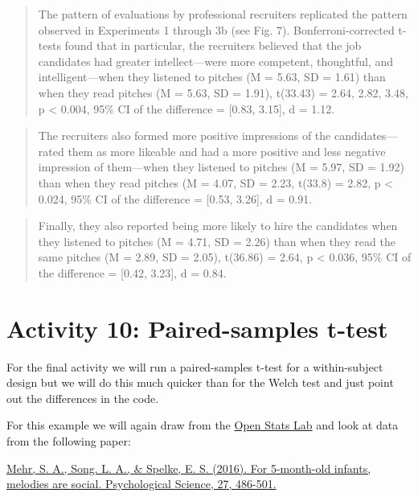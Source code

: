 \documentclass[]{book}
\begin{document}
\begin{quote}
The pattern of evaluations by professional recruiters replicated the pattern observed in Experiments 1 through 3b (see Fig. 7). Bonferroni-corrected t-tests found that in particular, the recruiters believed that the job candidates had greater intellect---were more competent, thoughtful, and intelligent---when they listened to pitches (M = 5.63, SD = 1.61) than when they read pitches (M = 5.63, SD = 1.91), t(33.43) = 2.64, 2.82, 3.48, p \textless{} 0.004, 95\% CI of the difference = {[}0.83, 3.15{]}, d = 1.12.
\end{quote}

\begin{quote}
The recruiters also formed more positive impressions of the candidates---rated them as more likeable and had a more positive and less negative impression of them---when they listened to pitches (M = 5.97, SD = 1.92) than when they read pitches (M = 4.07, SD = 2.23, t(33.8) = 2.82, p \textless{} 0.024, 95\% CI of the difference = {[}0.53, 3.26{]}, d = 0.91.
\end{quote}

\begin{quote}
Finally, they also reported being more likely to hire the candidates when they listened to pitches (M = 4.71, SD = 2.26) than when they read the same pitches (M = 2.89, SD = 2.05), t(36.86) = 2.64, p \textless{} 0.036, 95\% CI of the difference = {[}0.42, 3.23{]}, d = 0.84.
\end{quote}

\hypertarget{activity-10-paired-samples-t-test}{%
\section{Activity 10: Paired-samples t-test}\label{activity-10-paired-samples-t-test}}

For the final activity we will run a paired-samples t-test for a within-subject design but we will do this much quicker than for the Welch test and just point out the differences in the code.

For this example we will again draw from the \href{https://sites.trinity.edu/osl/data-sets-and-activities/t-test-activities}{Open Stats Lab} and look at data from the following paper:

\href{https://journals.sagepub.com/stoken/default+domain/d5HcBHg85XamSXGdYqYN/full}{Mehr, S. A., Song. L. A., \& Spelke, E. S. (2016). For 5-month-old infants, melodies are social. Psychological Science, 27, 486-501.}
\end{document}
